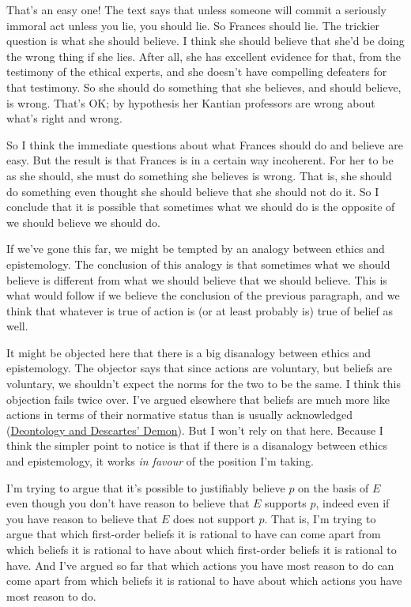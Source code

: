 \noindent That's an easy one! The text says that unless someone will commit a seriously immoral act unless you lie, you should lie. So Frances should lie. The trickier question is what she should believe. I think she should believe that she'd be doing the wrong thing if she lies. After all, she has excellent evidence for that, from the testimony of the ethical experts, and she doesn't have compelling defeaters for that testimony. So she should do something that she believes, and should believe, is wrong. That's OK; by hypothesis her Kantian professors are wrong about what's right and wrong. 

So I think the immediate questions about what Frances should do and believe are easy. But the result is that Frances is in a certain way incoherent. For her to be as she should, she must do something she believes is wrong. That is, she should do something even thought she should believe that she should not do it. So I conclude that it is possible that sometimes what we should do is the opposite of we should believe we should do.

If we've gone this far, we might be tempted by an analogy between ethics and epistemology. The conclusion of this analogy is that sometimes what we should believe is different from what we should believe that we should believe. This is what would follow if we believe the conclusion of the previous paragraph, and we think that whatever is true of action is (or at least probably is) true of belief as well.

It might be objected here that there is a big disanalogy between ethics and epistemology. The objector says that since actions are voluntary, but beliefs are voluntary, we shouldn't expect the norms for the two to be the same. I think this objection fails twice over. I've argued elsewhere that beliefs are much more like actions in terms of their normative status than is usually acknowledged (\href{http://brian.weatherson.org/DDD.pdf}{Deontology and Descartes' Demon}). But I won't rely on that here. Because I think the simpler point to notice is that if there is a disanalogy between ethics and epistemology, it works \textit{in favour} of the position I'm taking.

I'm trying to argue that it's possible to justifiably believe \(p\) on the basis of \(E\) even though you don't have reason to believe that \(E\) supports \(p\), indeed even if you have reason to believe that \(E\) does not support \(p\). That is, I'm trying to argue that which first-order beliefs it is rational to have can come apart from which beliefs it is rational to have about which first-order beliefs it is rational to have. And I've argued so far that which actions you have most reason to do can come apart from which beliefs it is rational to have about which actions you have most reason to do. 

